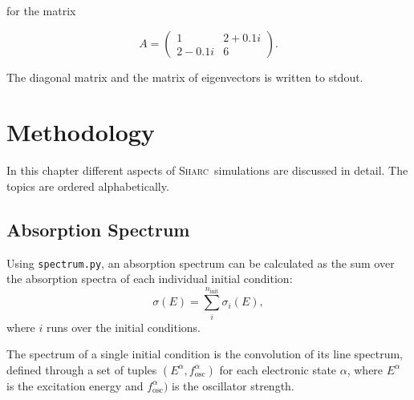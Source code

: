 \documentclass[a4paper,11pt,DIV=15,openany,twoside=false]{scrbook}
\newcommand{\tthdump}[1]{#1}
\newcommand{\sharc}{\textsc{Sharc}}
\newcommand{\ttt}[1]{\texttt{#1}}
\begin{document}
\normalsize
for the matrix 
\tthdump{
  \begin{equation}
    A=\begin{pmatrix}
        1 &2+0.1i\\
        2-0.1i&6
      \end{pmatrix}.\nonumber
  \end{equation}
}
The diagonal matrix and the matrix of eigenvectors is written to stdout.




\chapter{Methodology}

In this chapter different aspects of \sharc\ simulations are discussed in detail. The topics are ordered alphabetically.


\section{Absorption Spectrum}\label{met:spectrum}

Using \ttt{spectrum.py}, an absorption spectrum can be calculated as the sum over the absorption spectra of each individual initial condition:
\begin{equation}
  \sigma(E)=\sum\limits_i^{n_\text{init}} \sigma_i(E),
\end{equation}
where $i$ runs over the initial conditions.

The spectrum of a single initial condition is the convolution of its line spectrum, defined through a set of tuples $(E^\alpha,f_\text{osc}^\alpha)$ for each electronic state $\alpha$, where $E^\alpha$ is the excitation energy and $f_\text{osc}^\alpha)$ is the oscillator strength.
\end{document}
